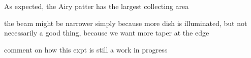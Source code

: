 \documentclass[preprint]{aastex}
\begin{document}
As expected, the Airy patter has the largest collecting area

the beam might be narrower simply because more dish is illuminated, but not necessarily a good thing, because we want more taper at the edge


comment on how this expt is still a work in progress













\end{document}
